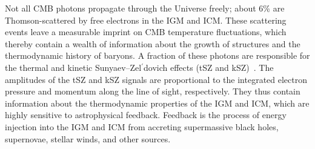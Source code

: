 \documentclass[PICOReport.tex]{subfiles}
\begin{document}
Not all CMB photons propagate through the Universe freely; about 6\% are Thomson-scattered by free electrons in the \ac{IGM} and \ac{ICM}.  These scattering events leave a measurable imprint on \ac{CMB} temperature fluctuations, which thereby contain a wealth of information about the growth of structures and the thermodynamic history of baryons. A fraction of these photons are responsible for the thermal and kinetic Sunyaev--Zel$^{\prime}$dovich effects (tSZ and kSZ)~\citep{zeldovich69,SZ1972}. 
The amplitudes of the tSZ and kSZ signals are proportional to the integrated electron pressure and momentum along the line of sight, respectively.  They thus contain information about the thermodynamic properties of the \ac{IGM} and \ac{ICM}, which are highly sensitive to astrophysical feedback. Feedback is the process of energy injection into the \ac{IGM} and \ac{ICM} from accreting supermassive black holes, supernovae, stellar winds, and other sources. 


%
\end{document}
